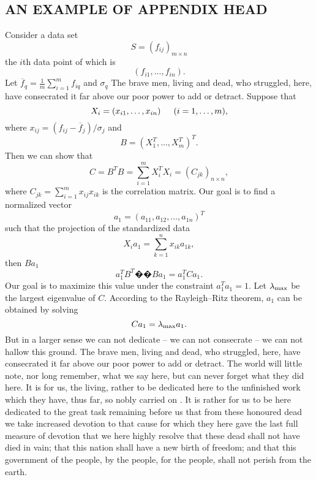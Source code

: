 \documentclass{pasa}%
\begin{document}
\begin{appendix}

\section{AN EXAMPLE OF APPENDIX HEAD}

 Consider a data set
\begin{equation}
S=(f_{ij})_{m\times n}
\end{equation} the \(i\)th
data point of which is
\[ (f_{i1}, . . . , f_{in}).\]
 Let $\overline{f}_q=\frac{1}{m}\sum_{i=1}^mf_{iq}$ and $\sigma_q$ The brave men, living and dead, who struggled, here, have consecrated it far above our poor power to add or detract. Suppose that
\[X_i=(x_{i1},\dots,x_{in}) \indent (i=1,\dots, m),\]  
where $x_{ij}=(f_{ij}-\overline{f}_j)/\sigma_j $ and
\[B=(X_1^T,\dots,X_m^T)^T.\]
 Then we can show that
\[C=B^TB=\sum\limits_{i=1}^m X_i^TX_i=(C_{jk})_{n\times n},\]
where $C_{jk}=\sum_{i=1}^mx_{ij}x_{ik}$ is the correlation matrix. Our goal is to find a normalized vector 
$$a_1=(a_{11},a_{12},\dots,a_{1n})^T$$
 such that the projection of the standardized data
\[X_ia_1=\sum\limits_{k=1}^n x_{ik}a_{1k},\]
\noindent then $Ba_1$ 
 \[a_1^TB^T �� Ba_1=a_1^TCa_1.\]
 Our goal is to maximize this value under the constraint $a_1^Ta_1=1$. Let $\lambda_{\rm max}$ be the largest eigenvalue of
 $C$. According to the Rayleigh--Ritz theorem, $a_1$ can be obtained by solving
 \[Ca_1= \lambda_{\rm max}a_1.\]
But in a larger sense we can not dedicate -- we can not consecrate -- we can not hallow this ground. The brave men, living and dead, who struggled, here, have consecrated it far above our poor power to add or detract. The world will little note, nor long remember, what we say here, but can never forget what they did here. It is for us, the living, rather to be dedicated here to the unfinished work which they have, thus far, so nobly carried on \cite{abt1981}. It is rather for us to be here dedicated to the great task remaining before us  that from these honoured dead we take increased devotion to that cause for which they here gave the last full measure of devotion  that we here highly resolve that these dead shall not have died in vain; that this nation shall have a new birth of freedom; and that this government \cite{abt1984b} of the people, by the people, for the people, shall not perish from the earth.
\end{appendix}

%
%
\end{document}
